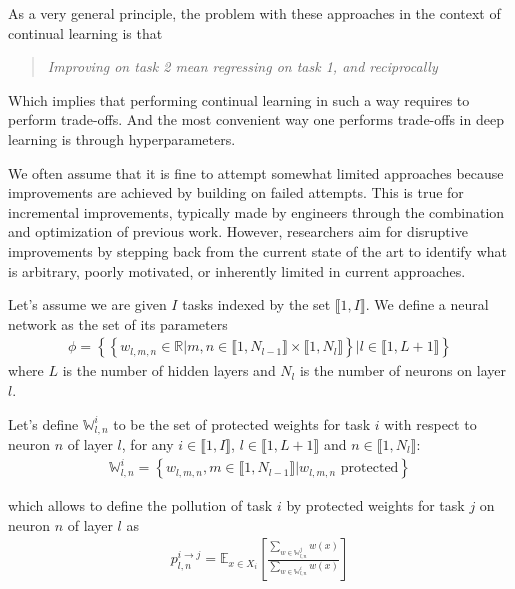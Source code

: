 \documentclass{article}
\newcommand{\intset}[2]{\llbracket #1, #2 \rrbracket}
\begin{document}
As a very general principle, the problem with these approaches in the context of continual learning is that
\begin{quote}
    \itshape
    \centering
    Improving on task 2 mean regressing on task 1, and reciprocally
\end{quote}

\noindent
Which implies that performing continual learning in such a way requires to perform trade-offs. And the most convenient way one performs trade-offs in deep learning is through hyperparameters.

\vspace{0.5cm}

\noindent
We often assume that it is fine to attempt somewhat limited approaches because improvements are achieved by building on failed attempts. This is true for incremental improvements, typically made by engineers through the combination and optimization of previous work. However, researchers aim for disruptive improvements by stepping back from the current state of the art to identify what is arbitrary, poorly motivated, or inherently limited in current approaches.

\vspace{0.5cm}


\noindent
Let's assume we are given $I$ tasks indexed by the set $\intset{1}{I}$. We define a neural network as the set of its parameters
\begin{align}
    \phi = \left\{\left\{ w_{l,m,n} \in \mathbb{R} | m,n \in \llbracket 1, N_{l-1} \rrbracket \times \llbracket 1, N_{l} \rrbracket \right\} | l \in \llbracket 1, L+1 \rrbracket \right\}
\end{align}
where $L$ is the number of hidden layers and $N_l$ is the number of neurons on layer $l$.

\noindent
Let's define $\mathbb{W}_{l,n}^i$ to be the set of protected weights for task $i$ with respect to neuron $n$ of layer $l$, for any $i \in \intset{1}{I}$, $l \in \intset{1}{L+1}$ and $n \in \intset{1}{N_l}$:
\begin{align}
    \mathbb{W}_{l,n}^i = \left\{ w_{l,m,n}, m \in \intset{1}{N_{l-1}} | w_{l,m,n} \text{ protected} \right\}
\end{align}

\noindent
which allows to define the pollution of task $i$ by protected weights for task $j$ on neuron $n$ of layer $l$ as
\begin{align}
    p_{l,n}^{i\rightarrow j} = \mathbb{E}_{x\in X_i}\left[\frac{\sum_{w \in \mathbb{W}_{l,n}^j}{w(x)}}{\sum_{w \in \mathbb{W}_{l,n}^i}{w(x)}}\right]
\end{align}
\end{document}
